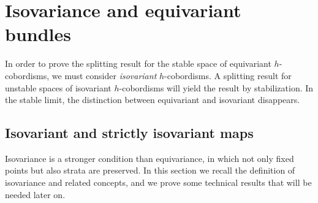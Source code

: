 \documentclass[11pt]{amsart}
\newtheorem{lem}{Lemma}[section]
\theoremstyle{definition}
\numberwithin{equation}{section}
\numberwithin{figure}{section}
\newcommand{\mc}{\mathcal}
\newcommand{\Manstr}{\mc M^\mathrm{Strat}}
\begin{document}
  
% 
% 	
% 	




\section{Isovariance and equivariant bundles}

In order to prove the splitting result for the stable space of equivariant $h$-cobordisms, we must consider \emph{isovariant} $h$-cobordisms. A splitting result for unstable spaces of isovariant $h$-cobordisms will yield the result by stabilization. In the stable limit, the distinction between equivariant and isovariant disappears.

\subsection{Isovariant and strictly isovariant maps}\label{isov}
Isovariance is a stronger condition than equivariance, in which not only fixed points but also strata are preserved. In this section we recall the definition of isovariance and related concepts, and we prove some technical results that will be needed later on.
\end{document}
